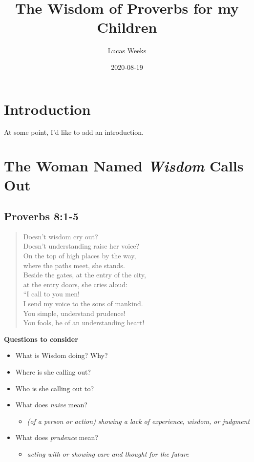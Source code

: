 \documentclass[
]{book}
\title{The Wisdom of Proverbs for my Children}
\author{Lucas Weeks}
\date{2020-08-19}
\providecommand{\tightlist}{%
  \setlength{\itemsep}{0pt}\setlength{\parskip}{0pt}}
\begin{document}
\maketitle

{
\setcounter{tocdepth}{1}
\tableofcontents
}
\hypertarget{introduction}{%
\chapter{Introduction}\label{introduction}}

At some point, I'd like to add an introduction.

\hypertarget{the-woman-named-wisdom-calls-out}{%
\chapter{\texorpdfstring{The Woman Named \emph{Wisdom} Calls Out}{The Woman Named Wisdom Calls Out}}\label{the-woman-named-wisdom-calls-out}}

\hypertarget{proverbs-81-5}{%
\section{Proverbs 8:1-5}\label{proverbs-81-5}}

\begin{quote}
Doesn't wisdom cry out?\\
Doesn't understanding raise her voice?\\
On the top of high places by the way,\\
where the paths meet, she stands.\\
Beside the gates, at the entry of the city,\\
at the entry doors, she cries aloud:\\
``I call to you men!\\
I send my voice to the sons of mankind.\\
You simple, understand prudence!\\
You fools, be of an understanding heart!
\end{quote}

\textbf{Questions to consider}

\begin{itemize}
\tightlist
\item
  What is Wisdom doing? Why?
\item
  Where is she calling out?
\item
  Who is she calling out to?
\item
  What does \emph{naive} mean?

  \begin{itemize}
  \tightlist
  \item
    \emph{(of a person or action) showing a lack of experience, wisdom, or judgment}
  \end{itemize}
\item
  What does \emph{prudence} mean?

  \begin{itemize}
  \tightlist
  \item
    \emph{acting with or showing care and thought for the future}
  \end{itemize}
\end{itemize}
\end{document}
